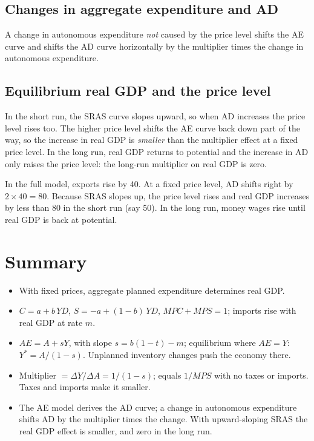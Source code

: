 \subsection{Changes in aggregate expenditure and AD}

A change in autonomous expenditure \emph{not} caused by the price level shifts the AE curve
and shifts the AD curve horizontally by the multiplier times the change in autonomous
expenditure.

\subsection{Equilibrium real GDP and the price level}

In the short run, the SRAS curve slopes upward, so when AD increases the price level
rises too. The higher price level shifts the AE curve back down part of the way, so the
increase in real GDP is \emph{smaller} than the multiplier effect at a fixed price level.
In the long run, real GDP returns to potential and the increase in AD only raises the
price level: the long-run multiplier on real GDP is zero.

\begin{example}
In the full model, exports rise by 40. At a fixed price level, AD shifts right by
$2 \times 40 = 80$. Because SRAS slopes up, the price level rises and real GDP increases
by less than 80 in the short run (say 50). In the long run, money wages rise until real GDP
is back at potential.
\end{example}

\section{Summary}

\begin{itemize}
  \item With fixed prices, aggregate planned expenditure determines real GDP.
  \item $C = a + b\,YD$, $S = -a + (1 - b)\,YD$, $MPC + MPS = 1$; imports rise with real
        GDP at rate $m$.
  \item $AE = A + sY$, with slope $s = b(1 - t) - m$; equilibrium where $AE = Y$:
        $Y^{*} = A/(1 - s)$. Unplanned inventory changes push the economy there.
  \item Multiplier $= \Delta Y/\Delta A = 1/(1 - s)$; equals $1/MPS$ with no taxes or
        imports. Taxes and imports make it smaller.
  \item The AE model derives the AD curve; a change in autonomous expenditure shifts AD by
        the multiplier times the change. With upward-sloping SRAS the real GDP effect is
        smaller, and zero in the long run.
\end{itemize}
